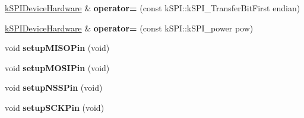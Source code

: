\begin{DoxyCompactItemize}
\item 
\hyperlink{classkSPIDeviceHardware}{k\+S\+P\+I\+Device\+Hardware} \& {\bfseries operator=} (const k\+S\+P\+I\+::k\+S\+P\+I\+\_\+\+Transfer\+Bit\+First endian)\hypertarget{classkSPIDeviceHardware_a522099238f3bad48a79f93b020ac24c5}{}\label{classkSPIDeviceHardware_a522099238f3bad48a79f93b020ac24c5}

\item 
\hyperlink{classkSPIDeviceHardware}{k\+S\+P\+I\+Device\+Hardware} \& {\bfseries operator=} (const k\+S\+P\+I\+::k\+S\+P\+I\+\_\+power pow)\hypertarget{classkSPIDeviceHardware_ae426a4bfdebc93c6bc881389b877361d}{}\label{classkSPIDeviceHardware_ae426a4bfdebc93c6bc881389b877361d}

\item 
void {\bfseries setup\+M\+I\+S\+O\+Pin} (void)\hypertarget{classkSPIDeviceHardware_ad7d69f31bbdde466f70a36a430725bf5}{}\label{classkSPIDeviceHardware_ad7d69f31bbdde466f70a36a430725bf5}

\item 
void {\bfseries setup\+M\+O\+S\+I\+Pin} (void)\hypertarget{classkSPIDeviceHardware_a1ecbe2c47374eae569823e42aa935626}{}\label{classkSPIDeviceHardware_a1ecbe2c47374eae569823e42aa935626}

\item 
void {\bfseries setup\+N\+S\+S\+Pin} (void)\hypertarget{classkSPIDeviceHardware_a3a4ba8b61620a400cfc0264eb102d26f}{}\label{classkSPIDeviceHardware_a3a4ba8b61620a400cfc0264eb102d26f}

\item 
void {\bfseries setup\+S\+C\+K\+Pin} (void)\hypertarget{classkSPIDeviceHardware_a37830215a2358c18770d3900db3db1c9}{}\label{classkSPIDeviceHardware_a37830215a2358c18770d3900db3db1c9}

\end{DoxyCompactItemize}
